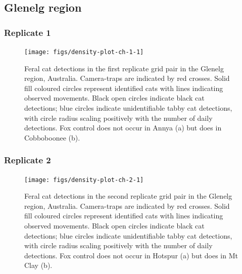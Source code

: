 \documentclass[]{elsarticle} %
\begin{document}
\hypertarget{glenelg-region}{%
\subsection{Glenelg region}\label{glenelg-region}}

\hypertarget{replicate-1}{%
\subsubsection{Replicate 1}\label{replicate-1}}

\begin{figure}

{\centering \texttt{[image: figs/density-plot-ch-1-1]} 

}

\caption{Feral cat detections in the first replicate grid pair in the Glenelg region, Australia. Camera-traps are indicated by red crosses. Solid fill coloured circles represent identified cats with lines indicating observed movements. Black open circles indicate black cat detections; blue circles indicate unidentifiable tabby cat detections, with circle radius scaling positively with the number of daily detections. Fox control does not occur in Annya (a) but does in Cobboboonee (b).}\label{fig:density-plot-ch-1}
\end{figure}

\newpage

\hypertarget{replicate-2}{%
\subsubsection{Replicate 2}\label{replicate-2}}

\begin{figure}

{\centering \texttt{[image: figs/density-plot-ch-2-1]} 

}

\caption{Feral cat detections in the second replicate grid pair in the Glenelg region, Australia. Camera-traps are indicated by red crosses. Solid fill coloured circles represent identified cats with lines indicating observed movements. Black open circles indicate black cat detections; blue circles indicate unidentifiable tabby cat detections, with circle radius scaling positively with the number of daily detections. Fox control does not occur in Hotspur (a) but does in Mt Clay (b).}\label{fig:density-plot-ch-2}
\end{figure}

\newpage
\end{document}
